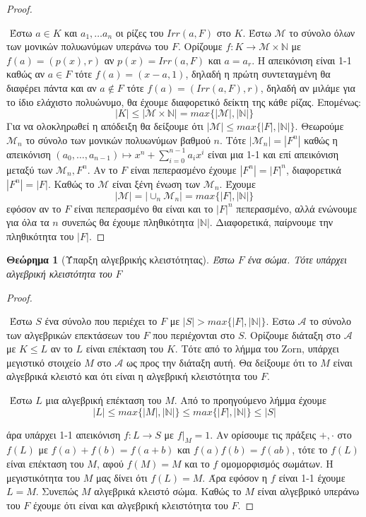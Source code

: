 \documentclass[oneside,a4paper]{article}
\newtheorem{theorem}{Θεώρημα}
\newcommand {\tl}{\textlatin}
\begin{document}
\begin{proof} $ $

	$ $\newline
	Έστω $a \in K$ και $a_1 ,\ldots a_n$ οι ρίζες του $Irr(a,F)$ στο $K$. Έστω $\mathcal M$ το σύνολο όλων των μονικών πολυωνύμων υπεράνω του $F$. Ορίζουμε $f: K \rightarrow \mathcal M \times \mathbb N$ με $f(a) = (p(x),r)$ αν $p(x) = Irr(a,F)$ και $a = a_r$. Η απεικόνιση είναι 1-1 καθώς αν $a \in F$ τότε $f(a) = (x-a,1)$, δηλαδή η πρώτη συντεταγμένη θα διαφέρει πάντα και αν $a \not\in F$ τότε $f(a) = (Irr(a,F),r)$, δηλαδή αν μιλάμε για το ίδιο ελάχιστο πολυώνυμο, θα έχουμε διαφορετικό δείκτη της κάθε ρίζας. Επομένως:
	$$|K| \leq |\mathcal M \times \mathbb N | = max\{|\mathcal M |, |\mathbb{N}|\}$$ 
	Για να ολοκληρωθεί η απόδειξη θα δείξουμε ότι $|\mathcal M| \leq max\{|F|, |\mathbb N |\}$. Θεωρούμε $\mathcal{M}_n$ το σύνολο των μονικών πολυωνύμων βαθμού $n$. Τότε $|\mathcal{M}_n| = |F^n|$ καθώς η απεικόνιση $(a_0 ,\ldots,a_{n-1}) \mapsto x^n + \sum\limits_{i=0}^{n-1} a_i x^i$ είναι μια 1-1 και επί απεικόνιση μεταξύ των $\mathcal{M}_n, F^n$. Αν το $F$ είναι πεπερασμένο έχουμε $|F^n| = |F|^n$, διαφορετικά $|F^n| = |F|$. Καθώς το $\mathcal M$ είναι ξένη ένωση των $\mathcal{M}_n$. Έχουμε 
	$$|\mathcal M| = |\cup_n \mathcal{M}_n | = max\{|F|,|\mathbb N | \}$$
	εφόσον αν το $F$ είναι πεπερασμένο θα είναι και το $|F|^n$ πεπερασμένο, αλλά ενώνουμε για όλα τα $n$ συνεπώς θα έχουμε πληθικότητα $|\mathbb{N}|$. Διαφορετικά, παίρνουμε την πληθικότητα του $|F|$.
\end{proof}
\vspace{0.1cm}

\begin{theorem}[Ύπαρξη αλγεβρικής κλειστότητας]
	Έστω $F$ ένα σώμα. Τότε υπάρχει αλγεβρική κλειστότητα του $F$
\end{theorem}

\begin{proof} $ $
	
	$ $\newline
	Έστω $S$ ένα σύνολο που περιέχει το $F$ με $|S| > max\{|F|,|\mathbb N|\}$. Εστω $\mathcal A$ το σύνολο των αλγεβρικών επεκτάσεων του $F$ που περιέχονται στο $S$. Ορίζουμε διάταξη στο $\mathcal A$ με $K\leq L$ αν το $L$ είναι επέκταση του $K$. Τότε από το λήμμα του \tl{Zorn}, υπάρχει μεγιστικό στοιχείο $M$ στο $\mathcal A$ ως προς την διάταξη αυτή. Θα δείξουμε ότι το $M$ είναι αλγεβρικά κλειστό και ότι είναι η αλγεβρική κλειστότητα του $F$.

	$ $\newline
	Έστω $L$ μια αλγεβρική επέκταση του $M$. Από το προηγούμενο λήμμα έχουμε
	$$|L| \leq max\{|M|,|\mathbb N|\} \leq max\{|F|,|\mathbb N|\} \leq |S|$$

	\noindent άρα υπάρχει 1-1 απεικόνιση $f:L \rightarrow S$ με $f|_M = 1$. Αν ορίσουμε τις πράξεις $+,\cdot$ στο $f(L)$ με $f(a)+f(b) = f(a+b)$ και $f(a)f(b) = f(ab)$, τότε το $f(L)$ είναι επέκταση του $M$, αφού $f(M) = M$ και το $f$ ομομορφισμός σωμάτων. Η μεγιστικότητα του $M$ μας δίνει ότι $f(L) = M$. Άρα εφόσον η $f$ είναι 1-1 έχουμε $L = M$. Συνεπώς $M$ αλγεβρικά κλειστό σώμα. Καθώς το $M$ είναι αλγεβρικό υπεράνω του $F$ έχουμε ότι είναι και αλγεβρική κλειστότητα του $F$.	
\end{proof}
\end{document}

